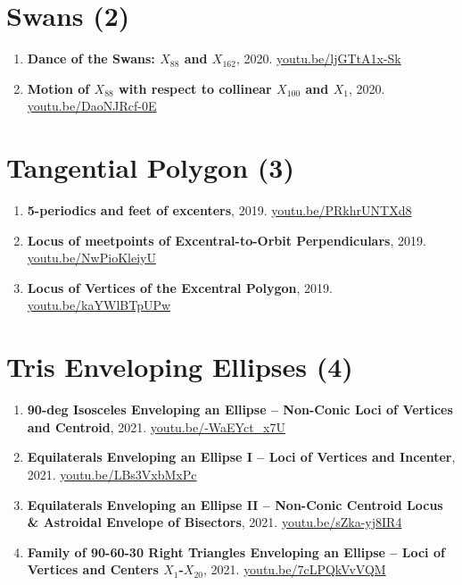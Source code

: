 \documentclass[12pt]{article}
\begin{document}
\section{Swans (2)}

\begin{enumerate}[resume]
\item \textbf{Dance of the Swans: $X_{88}$ and $X_{162}$}, 2020. \href{https://youtu.be/ljGTtA1x-Sk}{\url{youtu.be/ljGTtA1x-Sk}}
\item \textbf{Motion of $X_{88}$ with respect to collinear $X_{100}$ and $X_{1}$}, 2020. \href{https://youtu.be/DaoNJRcf-0E}{\url{youtu.be/DaoNJRcf-0E}}
\end{enumerate}

\section{Tangential Polygon (3)}

\begin{enumerate}[resume]
\item \textbf{5-periodics and feet of excenters}, 2019. \href{https://youtu.be/PRkhrUNTXd8}{\url{youtu.be/PRkhrUNTXd8}}
\item \textbf{Locus of meetpoints of Excentral-to-Orbit Perpendiculars}, 2019. \href{https://youtu.be/NwPioKleiyU}{\url{youtu.be/NwPioKleiyU}}
\item \textbf{Locus of Vertices of the Excentral Polygon}, 2019. \href{https://youtu.be/kaYWlBTpUPw}{\url{youtu.be/kaYWlBTpUPw}}
\end{enumerate}

\section{Tris Enveloping Ellipses (4)}

\begin{enumerate}[resume]
\item \textbf{90-deg Isosceles Enveloping an Ellipse -- Non-Conic Loci of Vertices and Centroid}, 2021. \href{https://youtu.be/-WaEYct_x7U}{\url{youtu.be/-WaEYct\_x7U}}
\item \textbf{Equilaterals Enveloping an Ellipse I -- Loci of Vertices and Incenter}, 2021. \href{https://youtu.be/LBs3VxbMxPc}{\url{youtu.be/LBs3VxbMxPc}}
\item \textbf{Equilaterals Enveloping an Ellipse II -- Non-Conic Centroid Locus \& Astroidal Envelope of Bisectors}, 2021. \href{https://youtu.be/sZka-yj8IR4}{\url{youtu.be/sZka-yj8IR4}}
\item \textbf{Family of 90-60-30 Right Triangles Enveloping an Ellipse -- Loci of Vertices and Centers $X_{1}$-$X_{20}$}, 2021. \href{https://youtu.be/7cLPQkVvVQM}{\url{youtu.be/7cLPQkVvVQM}}
\end{enumerate}
\end{document}

